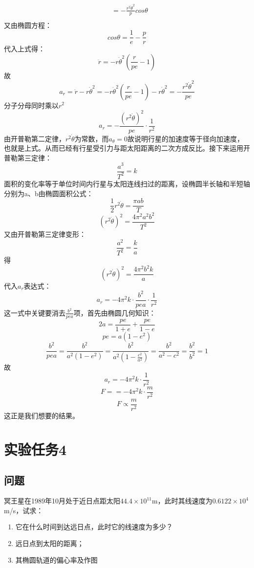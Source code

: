 \documentclass[12pt]{article}
\begin{document}
\begin{CJK*}{UTF8}{gbsn}
\begin{enumerate}
\begin{align*}
         &= -\frac{r^{2}\dot{\theta}^{2}}{p}cos\theta\\
\end{align*}
又由椭圆方程：
$$cos\theta = \frac{1}{e} - \frac{p}{r}$$
代入上式得：
$$\ddot{r} = -r\dot{\theta}^{2}(\frac{r}{pe} - 1)$$
故
$$a_{r} = \ddot{r} - r\dot{\theta}^{2} = -r\dot{\theta}^{2}(\frac{r}{pe} - 1)-r\dot{\theta}^{2} = -\frac{r^{2}\dot{\theta}^{2}}{pe}$$
分子分母同时乘以$r^{2}$
$$a_{r} = -\frac{(r^{2}\dot{\theta})^{2}}{pe}\cdot\frac{1}{r^{2}}$$
由开普勒第二定律，$r^{2}\dot{\theta}$为常数，而$a_{\theta} = 0$故说明行星的加速度等于径向加速度，也就是上式。从而已经有行星受引力与距太阳距离的二次方成反比。接下来运用开普勒第三定律：
$$\frac{a^{3}}{T^{2}} = k$$
面积的变化率等于单位时间内行星与太阳连线扫过的距离，设椭圆半长轴和半短轴分别为a、b由椭圆面积公式：
$$\frac{1}{2}r^{2}\dot{\theta} = \frac{\pi ab}{T}$$
$$(r^{2}\dot{\theta})^{2} = \frac{4\pi^{2}a^{2}b^{2}}{T^{2}}$$
又由开普勒第三定律变形：
$$\frac{a^{2}}{T^{2}} = \frac{k}{a}$$
得
$$(r^{2}\dot{\theta})^{2} = \frac{4\pi^{2}b^{2}k}{a}$$
代入$a_{r}$表达式：
$$a_{r} = -4\pi^{2}k\cdot\frac{b^{2}}{pea}\cdot\frac{1}{r^{2}}$$
这一式中关键要消去$\frac{b^{2}}{pea}$项，首先由椭圆几何知识：
$$2a = \frac{pe}{1+e} + \frac{pe}{1-e}$$
$$pe = a(1-e^{2})$$
$$\frac{b^{2}}{pea}=\frac{b^{2}}{a^{2}(1-e^{2})}=\frac{b^{2}}{a^{2}(1-\frac{c^{2}}{a^{2}})}
=\frac{b^{2}}{a^{2}-c^{2}}=\frac{b^{2}}{b^{2}}=1$$
故
$$a_{r} = -4\pi^{2}k\cdot\frac{1}{r^{2}}$$
$$F = = -4\pi^{2}k\cdot\frac{m}{r^{2}}$$
$$F \propto \frac{m}{r^{2}}$$
这正是我们想要的结果。
\end{enumerate}

\section{实验任务4}
\subsection*{问题}
冥王星在1989年10月处于近日点距太阳$44.4\times10^{11}$m，此时其线速度为$0.6122\times10^{4}$m/s，试求：
\begin{enumerate}
\item
它在什么时间到达远日点，此时它的线速度为多少？
\item
远日点到太阳的距离；
\item
其椭圆轨道的偏心率及作图
\end{enumerate}


\end{CJK*}
\end{document}
